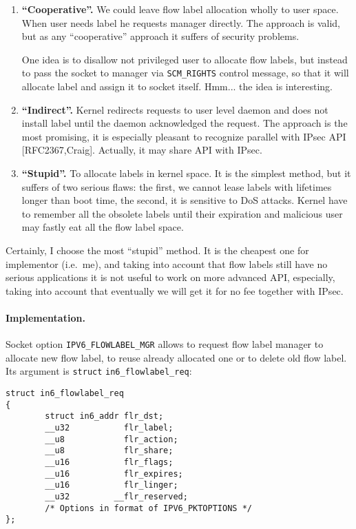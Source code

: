\begin{enumerate}
\item {\bf ``Cooperative''. } We could leave flow label allocation wholly
to user space. When user needs label he requests manager directly. The approach
is valid, but as any ``cooperative'' approach it suffers of security problems.

\begin{NB}
One idea is to disallow not privileged user to allocate flow
labels, but instead to pass the socket to manager via \verb|SCM_RIGHTS|
control message, so that it will allocate label and assign it to socket
itself. Hmm... the idea is interesting.
\end{NB}

\item {\bf ``Indirect''.} Kernel redirects requests to user level daemon
and does not install label until the daemon acknowledged the request.
The approach is the most promising, it is especially pleasant to recognize
parallel with IPsec API [RFC2367,Craig]. Actually, it may share API with
IPsec.

\item {\bf ``Stupid''.} To allocate labels in kernel space. It is the simplest
method, but it suffers of two serious flaws: the first,
we cannot lease labels with lifetimes longer than boot time, the second,
it is sensitive to DoS attacks. Kernel have to remember all the obsolete
labels until their expiration and malicious user may fastly eat all the
flow label space.

\end{enumerate}

Certainly, I choose the most ``stupid'' method. It is the cheapest one
for implementor (i.e.\ me), and taking into account that flow labels
still have no serious applications it is not useful to work on more
advanced API, especially, taking into account that eventually we
will get it for no fee together with IPsec.


\paragraph{Implementation.}
Socket option \verb|IPV6_FLOWLABEL_MGR| allows to
request flow label manager to allocate new flow label, to reuse
already allocated one or to delete old flow label.
Its argument is \verb|struct| \verb|in6_flowlabel_req|:

\begin{verbatim}
struct in6_flowlabel_req
{
        struct in6_addr flr_dst;
        __u32           flr_label;
        __u8            flr_action;
        __u8            flr_share;
        __u16           flr_flags;
        __u16           flr_expires;
        __u16           flr_linger;
        __u32         __flr_reserved;
        /* Options in format of IPV6_PKTOPTIONS */
};
\end{verbatim}

